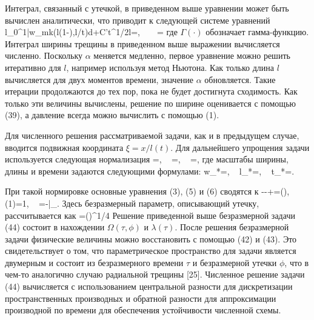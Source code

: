 \documentclass[main.tex]{subfiles}
\begin{document}
Интеграл, связанный с утечкой, в приведенном выше уравнении может быть вычислен аналитически, что приводит к следующей системе уравнений
\beq
l\int\limits_{0}^{1}{\bar{w}_{mk}}\left(l\left(1-\xi\right),\alpha l/t\right)d\xi+\sqrt{\pi}C't^{1/2}l=,\,\,\,\,\,\,\,\,\,\,
\alpha=
\eeq
где $\Gamma(\cdot)$ обозначает гамма-функцию.
Интеграл ширины трещины в приведенном выше выражении вычисляется численно.
Поскольку $\alpha$ меняется медленно, первое уравнение можно решить итеративно для $l$, например используя метод Ньютона.
Как только длина $l$ вычисляется для двух моментов времени, значение $\alpha$ обновляется.
Такие итерации продолжаются до тех пор, пока не будет достигнута сходимость.
Как только эти величины вычислены, решение по ширине оценивается с помощью (39), а давление всегда можно вычислить с помощью (1).

Для численного решения рассматриваемой задачи, как и в предыдущем случае, вводится подвижная координата $\xi=x/l(t)$.
Для дальнейшего упрощения задачи используется следующая нормализация
\beq
\Omega=,\,\,\,\,\,
\lambda=,\,\,\,\,\,
\tau=,
\eeq
где масштабы ширины, длины и времени задаются следующими формулами:
\beq
w_{*}=,\,\,\,\,\,
l_{*}=,\,\,\,\,\,
t_{*}=.
\eeq

При такой нормировке основные уравнения (3), (5) и (6) сводятся к
\beq
\frac{\partial\Omega}{\partial\tau}-\frac{\xi\dot{\lambda}}{\lambda}\frac{\partial\Omega}{\partial\xi}-+=\delta(\xi),\,\,\,\,\,
\Omega(1)=1,\,\,\,\,\,
=-\bigg|_{}.
\eeq
Здесь безразмерный параметр, описывающий утечку, рассчитывается как
\beq
\phi=\left(\right)^{1/4}
\eeq
Решение приведенной выше безразмерной задачи (44) состоит в нахождении $\Omega(\tau,\phi)$ и $\lambda(\tau)$.
После решения безразмерной задачи физические величины можно восстановить с помощью (42) и (43).
Это свидетельствует о том, что параметрическое пространство для задачи является двумерным и состоит из безразмерного времени $\tau$ и безразмерной утечки $\phi$, что в чем-то аналогично случаю радиальной трещины [25].
Численное решение задачи (44) вычисляется с использованием центральной разности для дискретизации пространственных производных и обратной разности для аппроксимации производной по времени для обеспечения устойчивости численной схемы.
\end{document}
